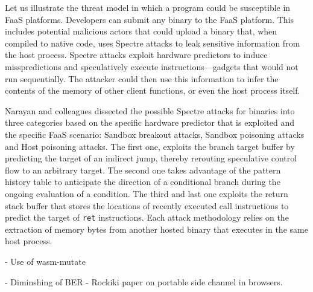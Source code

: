 
Let us illustrate the threat model in which a \Wasm program could be susceptible in FaaS platforms.
Developers can submit any \Wasm binary to the FaaS platform.
This includes potential malicious actors that could upload a \wasm binary that, when compiled to native code, uses Spectre attacks to leak sensitive information from the host process.
Spectre attacks exploit hardware predictors to induce misspredictions and speculatively execute instructions—gadgets that would not run sequentially. 
The attacker could then use this information to infer the contents of the memory of other client functions, or even the host process itself.

Narayan and colleagues \cite{Narayan2021Swivel} dissected the possible Spectre attacks for \wasm binaries into three categories based on the specific hardware predictor that is exploited and the specific FaaS scenario: Sandbox breakout attacks, Sandbox poisoning attacks and Host poisoning attacks.
The first one, exploits the branch target buffer by predicting the target of an indirect jump, thereby rerouting speculative control flow to an arbitrary target.
The second one takes advantage of the pattern history table to anticipate the direction of a conditional branch during the ongoing evaluation of a condition.
The third and last one exploits the return stack buffer that stores the locations of recently executed call instructions to predict the target of \texttt{ret} instructions. 
Each attack methodology relies on the extraction of memory bytes from another hosted \wasm binary that executes in the same host process.







- Use of wasm-mutate


- Diminshing of BER
- Rockiki paper on portable side channel in browsers.





